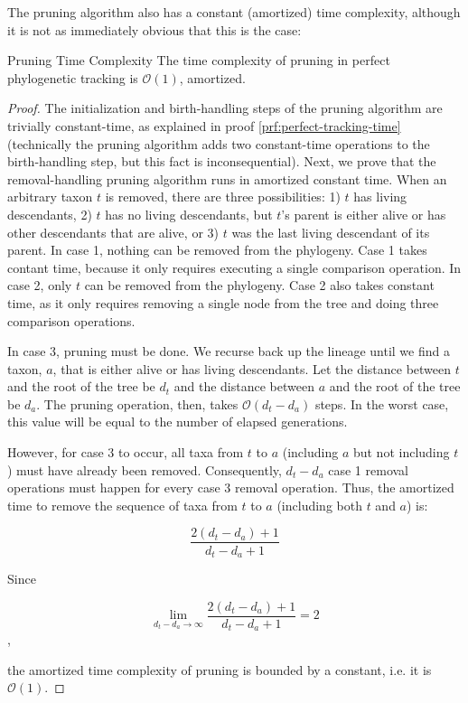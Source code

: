 The pruning algorithm also has a constant (amortized) time complexity, although it is not as immediately obvious that this is the case:

\begin{theorem}{Pruning Time Complexity}
\label{thm:perfect-tracking-with-pruning-time}
The time complexity of pruning in perfect phylogenetic tracking is $\mathcal{O}(1)$, amortized. 
\end{theorem}

\begin{proof}
\label{prf:perfect-tracking-with-pruning-time}
The initialization and birth-handling steps of the pruning algorithm are trivially constant-time, as explained in proof \ref{prf:perfect-tracking-time} (technically the pruning algorithm adds two constant-time operations to the birth-handling step, but this fact is inconsequential).
Next, we prove that the removal-handling pruning algorithm runs in amortized constant time.
When an arbitrary taxon $t$ is removed, there are three possibilities: 1) $t$ has living descendants, 2) $t$ has no living descendants, but $t$'s parent is either alive or has other descendants that are alive, or 3) $t$ was the last living descendant of its parent.
In case 1, nothing can be removed from the phylogeny.
Case 1 takes contant time, because it only requires executing a single comparison operation.
In case 2, only $t$ can be removed from the phylogeny.
Case 2 also takes constant time, as it only requires removing a single node from the tree and doing three comparison operations.

In case 3, pruning must be done.
We recurse back up the lineage until we find a taxon, $a$, that is either alive or has living descendants. 
Let the distance between $t$ and the root of the tree be $d_t$ and the distance between $a$ and the root of the tree be $d_a$.
The pruning operation, then, takes $\mathcal{O}(d_t - d_a)$ steps. 
In the worst case, this value will be equal to the number of elapsed generations.

However, for case 3 to occur, all taxa from $t$ to $a$ (including $a$ but not including $t$) must have already been removed.
Consequently, $d_t - d_a$ case 1 removal operations must happen for every case 3 removal operation.
Thus, the amortized time to remove the sequence of taxa from $t$ to $a$ (including both $t$ and $a$) is:

\[
\frac{2(d_t - d_a) + 1}{d_t - d_a + 1}
\]

Since

\[
\lim_{d_t - d_a\to\infty} \frac{2(d_t - d_a) + 1}{d_t - d_a + 1} = 2
\],

the amortized time complexity of pruning is bounded by a constant, i.e. it is $\mathcal{O}(1)$.


\end{proof}

